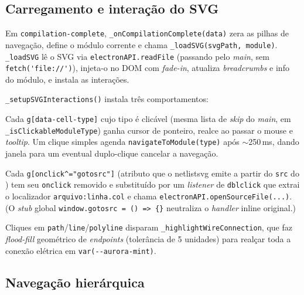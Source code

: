 \subsection{Carregamento e interação do SVG}

Em \lstinline|compilation-complete|, \lstinline|_onCompilationComplete(data)|
zera as pilhas de navegação, define o módulo corrente e chama
\lstinline|_loadSVG(svgPath, module)|. \lstinline|_loadSVG| lê o SVG via
\lstinline|electronAPI.readFile| (passando pelo \emph{main}, sem
\lstinline|fetch('file://')|), injeta-o no DOM com \emph{fade-in}, atualiza
\emph{breadcrumbs} e info do módulo, e instala as interações.

\lstinline|_setupSVGInteractions()| instala três comportamentos:

\begin{description}[leftmargin=1.4em,style=nextline]
  \item[Navegação por clique] Cada \lstinline|g[data-cell-type]| cujo tipo é
        clicável (mesma lista de \emph{skip} do \emph{main}, em
        \lstinline|_isClickableModuleType|) ganha cursor de ponteiro, realce ao
        passar o mouse e \emph{tooltip}. Um clique simples agenda
        \lstinline|navigateToModule(type)| após $\sim$250\,ms, dando janela para
        um eventual duplo-clique cancelar a navegação.
  \item[Abrir o código-fonte por duplo-clique] Cada
        \lstinline|g[onclick^="gotosrc"]| (atributo que o netlistsvg emite a
        partir do \lstinline|src| do ) tem seu \lstinline|onclick|
        removido e substituído por um \emph{listener} de \lstinline|dblclick| que
        extrai o localizador \lstinline|arquivo:linha.col| e chama
        \lstinline|electronAPI.openSourceFile(...)|. (O \emph{stub} global
        \lstinline|window.gotosrc = () => {}| neutraliza o \emph{handler} inline
        original.)
  \item[Realce de fios] Cliques em \lstinline|path|/\lstinline|line|/\lstinline|polyline|
        disparam \lstinline|_highlightWireConnection|, que faz \emph{flood-fill}
        geométrico de \emph{endpoints} (tolerância de 5 unidades) para realçar
        toda a conexão elétrica em \lstinline|var(--aurora-mint)|.
\end{description}

\subsection{Navegação hierárquica}

